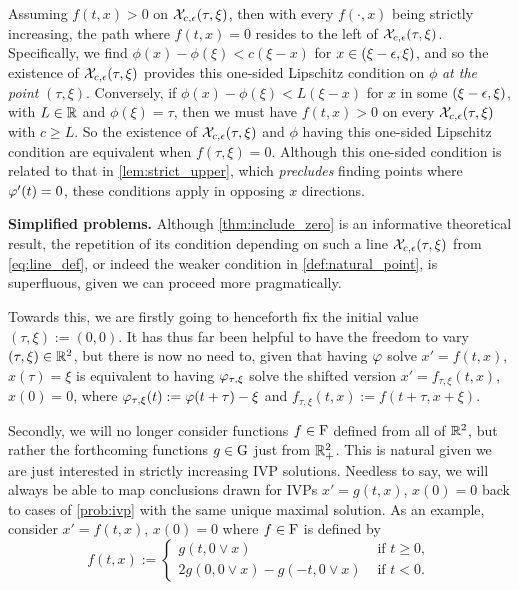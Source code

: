 Assuming $f(t,x)>0$ on $\mathcal{X}_{c,\epsilon}(\tau,\xi)$, then with every $f(\cdot,x)$ being strictly increasing, the path where $f(t,x)=0$ resides to the left of $\mathcal{X}_{c,\epsilon}(\tau,\xi)$. Specifically, we find $\phi(x)-\phi(\xi)<c(\xi-x)$ for $x\in(\xi-\epsilon,\xi)$, and so the existence of $\mathcal{X}_{c,\epsilon}(\tau,\xi)$ provides this one-sided Lipschitz condition on $\phi$ \emph{at the point} $(\tau,\xi)$. Conversely, if $\phi(x)-\phi(\xi)<L(\xi-x)$ for $x$ in some $(\xi-\epsilon,\xi)$, with $L\in\mathbb{R}$ and $\phi(\xi)=\tau$, then we must have $f(t,x)>0$ on every $\mathcal{X}_{c,\epsilon}(\tau,\xi)$ with $c\ge L$. So the existence of $\mathcal{X}_{c,\epsilon}(\tau,\xi)$ and $\phi$ having this one-sided Lipschitz condition are equivalent when $f(\tau,\xi)=0$. Although this one-sided condition is related to that in \autoref{lem:strict_upper}, which \emph{precludes} finding points where $\varphi'(t)=0$, these conditions apply in opposing $x$ directions.

\vspace{3mm}\textbf{Simplified problems.} Although \autoref{thm:include_zero} is an informative theoretical result, the repetition of its condition depending on such a line $\mathcal{X}_{c,\epsilon}(\tau,\xi)$ from \autoref{eq:line_def}, or indeed the weaker condition in \autoref{def:natural_point}, is superfluous, given we can proceed more pragmatically.

Towards this, we are firstly going to henceforth fix the initial value $(\tau,\xi):=(0,0)$. It has thus far been helpful to have the freedom to vary $(\tau,\xi)\in\mathbb{R}^2$, but there is now no need to, given that having $\varphi$ solve $x'=f(t,x)$, $x(\tau)=\xi$ is equivalent to having $\varphi_{\tau,\xi}$ solve the shifted version $x'=f_{\tau,\xi}(t,x)$, $x(0)=0$, where $\varphi_{\tau,\xi}(t):=\varphi(t+\tau)-\xi$ and $f_{\tau,\xi}(t,x):=f(t+\tau,x+\xi)$.

Secondly, we will no longer consider functions $f\in\mathrm{F}$ defined from all of $\mathbb{R}^2$, but rather the forthcoming functions $g\in\mathrm{G}$ just from $\mathbb{R}^2_+$. This is natural given we are just interested in strictly increasing IVP solutions. Needless to say, we will always be able to map conclusions drawn for IVPs $x'=g(t,x)$, $x(0)=0$ back to cases of \autoref{prob:ivp} with the same unique maximal solution. As an example, consider $x'=f(t,x)$, $x(0)=0$ where $f\in\mathrm{F}$ is defined by
\begin{equation}\label{eq:func_extension}
    f(t,x):=
    \begin{cases}
        g(t,0\vee x) & \text{ if } t\ge0,\\
        2g(0,0\vee x) - g(-t,0\vee x) & \text{ if } t<0.
    \end{cases}
\end{equation}

